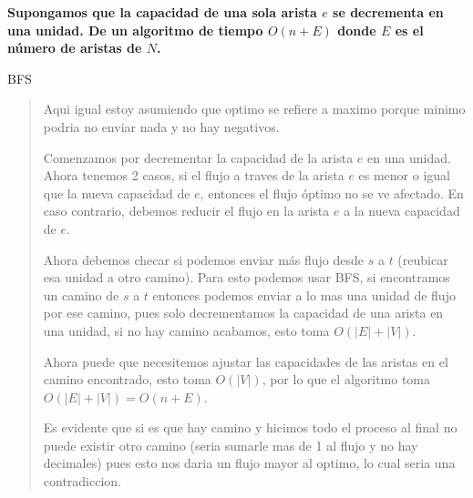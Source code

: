 \textbf{
    Supongamos que la capacidad de una sola arista $e$ se decrementa en una unidad. De un
    algoritmo de tiempo $O(n + E)$ donde $E$ es el número de aristas de $N$.
}\vspace{.2cm}

\textcolor{bibi}{BFS}
\begin{quote}
    Aqui igual estoy asumiendo que optimo se refiere a maximo porque minimo podria no enviar nada y no hay negativos. \vspace{.2cm}

    Comenzamos por decrementar la capacidad de la arista $e$ en una unidad. Ahora tenemos 2 casos, si el flujo a traves de la arista $e$ es menor o igual que la nueva capacidad de $e$, entonces el flujo óptimo no se ve afectado. En caso contrario, debemos reducir el flujo en la arista $e$ a la nueva capacidad de $e$. \vspace{.2cm}

    Ahora debemos checar si podemos enviar más flujo desde $s$ a $t$ (reubicar esa unidad a otro camino). Para esto podemos usar BFS, si encontramos un camino de $s$ a $t$ entonces podemos enviar a lo mas una unidad de flujo por ese camino, pues solo decrementamos la capacidad de una arista en una unidad, si no hay camino acabamos, esto toma $O(|E|+|V|)$. \vspace{.2cm}

    Ahora puede que necesitemos ajustar las capacidades de las aristas en el camino encontrado, esto toma $O(|V|)$, por lo que el algoritmo toma $O(|E|+|V|) = O(n+E)$. \vspace{.2cm}

    Es evidente que si es que hay camino y hicimos todo el proceso al final no puede existir otro camino (seria sumarle mas de 1 al flujo y no hay decimales) pues esto nos daria un flujo mayor al optimo, lo cual seria una contradiccion. \vspace{.2cm}
\end{quote}